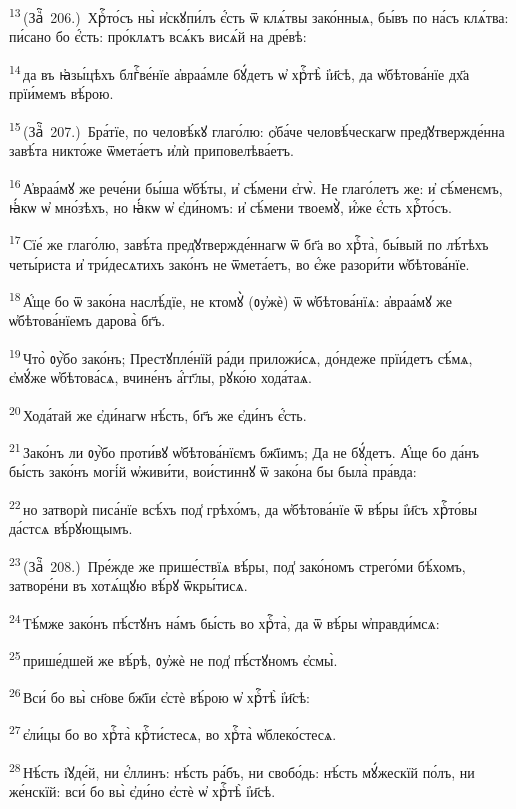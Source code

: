 \textsuperscript{13}\,(Заⷱ҇~206.)~Хрⷭ҇то́съ ны̀ и҆скꙋпи́лъ є҆́сть ѿ клѧ́твы зако́нныѧ, бы́въ по на́съ клѧ́тва: пи́сано бо є҆́сть: про́клѧтъ всѧ́къ висѧ́й на дре́вѣ:

\textsuperscript{14}\,да въ ꙗ҆зы́цѣхъ блгⷭ҇ве́нїе а҆враа́мле бꙋ́детъ ѡ҆ хрⷭ҇тѣ̀ і҆и҃сѣ, да ѡ҆бѣтова́нїе дх҃а прїи́мемъ вѣ́рою.

\textsuperscript{15}\,(Заⷱ҇~207.)~Бра́тїе, по человѣ́кꙋ глаго́лю: ѻ҆ба́че человѣ́ческагѡ пред̾ꙋтвержде́нна завѣ́та никто́же ѿмета́етъ и҆лѝ приповелѣва́етъ.

\textsuperscript{16}\,А҆враа́мꙋ же рече́ни бы́ша ѡ҆бѣ́ты, и҆ сѣ́мени є҆гѡ̀. Не глаго́летъ же: и҆ сѣ́менємъ, ꙗ҆́кѡ ѡ҆ мно́зѣхъ, но ꙗ҆́кѡ ѡ҆ є҆ди́номъ: и҆ сѣ́мени твоемꙋ̀, и҆́же є҆́сть хрⷭ҇то́съ.

\textsuperscript{17}\,Сїе́ же глаго́лю, завѣ́та пред̾ꙋтвержде́ннагѡ ѿ бг҃а во хрⷭ҇та̀, бы́вый по лѣ́тѣхъ четы́риста и҆ три́десѧтихъ зако́нъ не ѿмета́етъ, во є҆́же разори́ти ѡ҆бѣтова́нїе.

\textsuperscript{18}\,А҆́ще бо ѿ зако́на наслѣ́дїе, не ктомꙋ̀ (ᲂу҆жѐ) ѿ ѡ҆бѣтова́нїѧ: а҆враа́мꙋ же ѡ҆бѣтова́нїемъ дарова̀ бг҃ъ.

\textsuperscript{19}\,Что̀ ᲂу҆̀бо зако́нъ; Престꙋпле́нїй ра́ди приложи́сѧ, до́ндеже прїи́детъ сѣ́мѧ, є҆мꙋ́же ѡ҆бѣтова́сѧ, вчине́нъ а҆́гг҃лы, рꙋко́ю хода́таѧ.

\textsuperscript{20}\,Хода́тай же є҆ди́нагѡ нѣ́сть, бг҃ъ же є҆ди́нъ є҆́сть.

\textsuperscript{21}\,Зако́нъ ли ᲂу҆̀бо проти́вꙋ ѡ҆бѣтова́нїємъ бж҃їимъ; Да не бꙋ́детъ. А҆́ще бо да́нъ бы́сть зако́нъ могі́й ѡ҆живи́ти, вои́стиннꙋ ѿ зако́на бы была̀ пра́вда:

\textsuperscript{22}\,но затворѝ писа́нїе всѣ́хъ под̾ грѣхо́мъ, да ѡ҆бѣтова́нїе ѿ вѣ́ры і҆и҃съ хрⷭ҇то́вы да́стсѧ вѣ́рꙋющымъ.

\textsuperscript{23}\,(Заⷱ҇~208.)~Пре́жде же прише́ствїѧ вѣ́ры, под̾ зако́номъ стрего́ми бѣ́хомъ, затворе́ни въ хотѧ́щꙋю вѣ́рꙋ ѿкры́тисѧ.

\textsuperscript{24}\,Тѣ́мже зако́нъ пѣ́стꙋнъ на́мъ бы́сть во хрⷭ҇та̀, да ѿ вѣ́ры ѡ҆правди́мсѧ:

\textsuperscript{25}\,прише́дшей же вѣ́рѣ, ᲂу҆жѐ не под̾ пѣ́стꙋномъ є҆смы̀.

\textsuperscript{26}\,Вси́ бо вы̀ сн҃ове бж҃їи є҆стѐ вѣ́рою ѡ҆ хрⷭ҇тѣ̀ і҆и҃сѣ:

\textsuperscript{27}\,є҆ли́цы бо во хрⷭ҇та̀ крⷭ҇ти́стесѧ, во хрⷭ҇та̀ ѡ҆блеко́стесѧ.

\textsuperscript{28}\,Нѣ́сть і҆ꙋде́й, ни є҆́ллинъ: нѣ́сть ра́бъ, ни свобо́дь: нѣ́сть мꙋ́жескїй по́лъ, ни же́нскїй: вси́ бо вы̀ є҆ди́но є҆стѐ ѡ҆ хрⷭ҇тѣ̀ і҆и҃сѣ.

